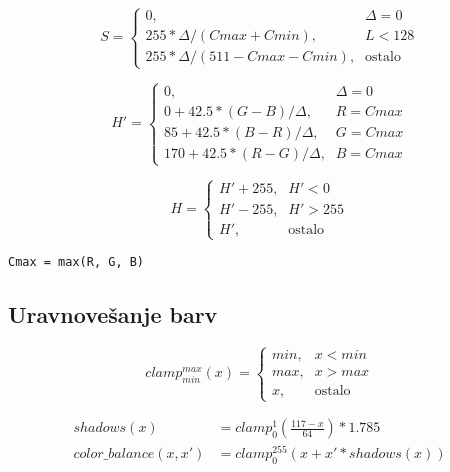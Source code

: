 \begin{equation}
S =
\begin{cases}
    0 \text{,}& \Delta = 0 \\
    255 * \Delta / (Cmax + Cmin) \text{,}& L < 128 \\
    255 * \Delta / (511 - Cmax - Cmin) \text{,}& \text{ostalo}
\end{cases}
\end{equation}

\begin{equation}
H' =
\begin{cases}
    0 \text{,}& \Delta = 0 \\
    0 + 42.5 * (G - B) / \Delta \text{,}& R = Cmax \\
    85 + 42.5 * (B - R) / \Delta \text{,}& G = Cmax \\
    170 + 42.5 * (R - G) / \Delta \text{,}& B = Cmax
\end{cases}
\end{equation}

\begin{equation}
H =
\begin{cases}
    H' + 255 \text{,}& H' < 0 \\
    H' - 255 \text{,}& H' > 255 \\
    H' \text{,}& \text{ostalo}
\end{cases}
\end{equation}

\begin{lstlisting}[caption=algoritem]
Cmax = max(R, G, B)

\end{lstlisting}


\subsection{Uravnovešanje barv}
\label{sec:obdelavaSlikUravnovesanjeBarv}

\begin{equation}
clamp_{min}^{max}(x) =
\begin{cases}
    min \text{,}& x < min \\
    max \text{,}& x > max \\
    x \text{,}& \text{ostalo}
\end{cases}
\end{equation}

\begin{align}
shadows(x) &= clamp_{0}^{1}(\frac{117 - x}{64}) * 1.785 \\
color\_balance(x, x') &= clamp_{0}^{255}(x + x' * shadows(x)) \label{eq:color_balance}
\end{align}

